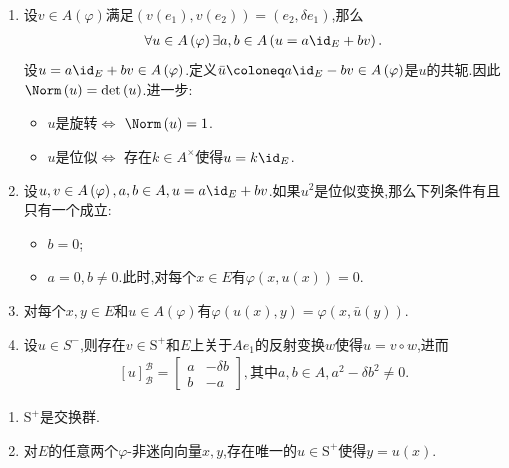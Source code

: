 \begin{remark}{}{}
	\begin{enumerate}
		\item 设$v\in A\left(\varphi\right)$满足$\left(v\left(e_{1}\right),v\left(e_{2}\right)\right)=\left(e_{2},\delta e_{1}\right)$,那么
		\begin{align*}
			\forall u\in A\left(\varphi\right)\exists a,b\in A\left(u=a\id_{E}+bv\right).
		\end{align*}
		设$u=a\id_{E}+bv\in A\left(\varphi\right)$.定义$\bar{u}\coloneq a\id_{E}-bv\in A\left(\varphi\right)$是$u$的共轭.因此$\Norm\left(u\right)=\det\left(u\right)$.进一步:
		\begin{itemize}
			\item $u$是旋转$\iff$ $\Norm\left(u\right)=1$.
			\item $u$是位似$\iff$ 存在$k\in A^{\times}$使得$u=k\id_{E}$.
		\end{itemize}
		\item 设$u,v\in A\left(\varphi\right),a,b\in A,u=a\id_{E}+bv$.如果$u^{2}$是位似变换,那么下列条件有且只有一个成立:
		\begin{itemize}
			\item $b=0$;
			\item $a=0,b\neq 0$.此时,对每个$x\in E$有$\varphi\left(x,u\left(x\right)\right)=0$.
		\end{itemize}
		\item 对每个$x,y\in E$和$u\in A\left(\varphi\right)$有$\varphi\left(u\left(x\right),y\right)=\varphi\left(x,\bar{u}\left(y\right)\right)$.
		\item 设$u\in S^{-}$,则存在$v\in \mathrm{S}^{+}$和$E$上关于$Ae_{1}$的反射变换$w$使得$u=v\circ w$,进而
		\begin{align*}
			\left[u\right]_{\mathcal{B}}^{\mathcal{B}}=
			\begin{bmatrix}
				a&-\delta b\\
				b&-a
			\end{bmatrix},\text{其中}a,b\in A,a^{2}-\delta b^{2}\neq 0.
		\end{align*}
	\end{enumerate}
\end{remark}

\begin{corollary}{}{}
	\begin{enumerate}
		\item $\mathrm{S}^{+}$是交换群.
		\item 对$E$的任意两个$\varphi$-非迷向向量$x,y$,存在唯一的$u\in \mathrm{S}^{+}$使得$y=u\left(x\right)$.
	\end{enumerate}
\end{corollary}


